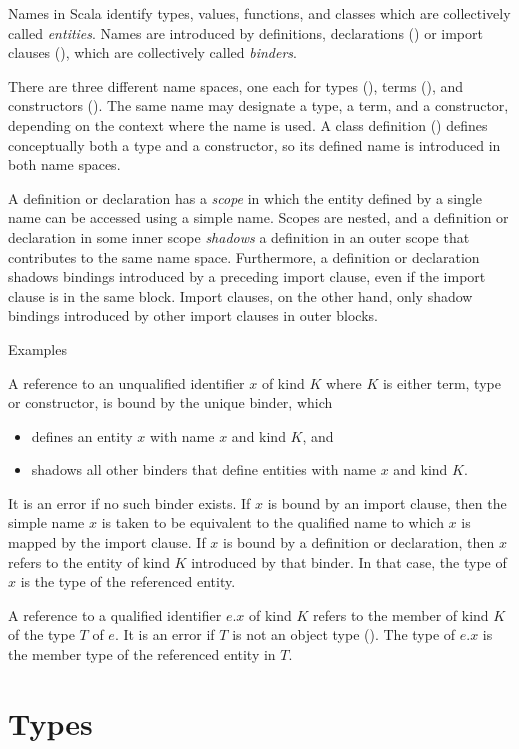 \documentclass[11pt]{report}
\renewcommand{\todo}[1]{#1}
\begin{document}
Names in Scala identify types, values, functions, and classes which
are collectively called {\em entities}.  Names are introduced by
definitions, declarations () or import clauses
(), which are collectively called {\em binders}.

There are three different name spaces, one each for types
(), terms (), and constructors
().  The same name may designate a type, a term, and
a constructor, depending on the context where the name is used.  A
class definition () defines conceptually both a type
and a constructor, so its defined name is introduced in both name
spaces.

A definition or declaration has a {\em scope} in which the entity
defined by a single name can be accessed using a simple name. Scopes
are nested, and a definition or declaration in some inner scope {\em
shadows} a definition in an outer scope that contributes to the same
name space. Furthermore, a definition or declaration shadows bindings
introduced by a preceding import clause, even if the import clause is
in the same block. Import clauses, on the other hand, only shadow
bindings introduced by other import clauses in outer blocks.

\todo{Examples}

A reference to an unqualified identifier $x$ of kind $K$ where $K$ is
either term, type or constructor, is bound by the unique binder, which
\begin{itemize}
\item defines an entity $x$ with name $x$ and kind $K$, and
\item shadows all other binders that define entities with name $x$
and kind $K$.
\end{itemize}
It is an error if no such binder exists.  If $x$ is bound by an import
clause, then the simple name $x$ is taken to be equivalent to the
qualified name to which $x$ is mapped by the import clause. If $x$ is bound by a definition or declaration,
then $x$ refers to the entity of kind $K$ introduced by that
binder. In that case, the type of $x$ is the type of the referenced
entity.

A reference to a qualified identifier $e.x$ of kind $K$ refers to the
member of kind $K$ of the type $T$ of $e$. It is an error if $T$ is
not an object type (). The type of $e.x$ is the
member type of the referenced entity in $T$.

\chapter{\label{sec:types}Types}
\end{document}
